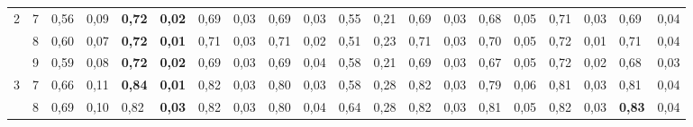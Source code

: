 \documentclass[conference]{IEEEtran}
\begin{document}
\begin{table}[]
\begin{tabular}{|cl|ll|ll|ll|ll|ll|ll|ll|ll|ll|}
		\multicolumn{1}{|c|}{\multirow{3}{*}{2}}  & 7 & \multicolumn{1}{l|}{0,56}          & 0,09          & \multicolumn{1}{l|}{\textbf{0,72}} & \textbf{0,02} & \multicolumn{1}{l|}{0,69}          & 0,03          & \multicolumn{1}{l|}{0,69} & 0,03          & \multicolumn{1}{l|}{0,55}                 & 0,21          & \multicolumn{1}{l|}{0,69}          & 0,03          & \multicolumn{1}{l|}{0,68}          & 0,05          & \multicolumn{1}{l|}{0,71}          & 0,03          & \multicolumn{1}{l|}{0,69}          & 0,04          \\ \cline{2-20} 
		\multicolumn{1}{|c|}{}                    & 8 & \multicolumn{1}{l|}{0,60}          & 0,07          & \multicolumn{1}{l|}{\textbf{0,72}} & \textbf{0,01} & \multicolumn{1}{l|}{0,71}          & 0,03          & \multicolumn{1}{l|}{0,71} & 0,02          & \multicolumn{1}{l|}{0,51}                 & 0,23          & \multicolumn{1}{l|}{0,71}          & 0,03          & \multicolumn{1}{l|}{0,70}          & 0,05          & \multicolumn{1}{l|}{0,72}          & 0,01          & \multicolumn{1}{l|}{0,71}          & 0,04          \\ \cline{2-20} 
		\multicolumn{1}{|c|}{}                    & 9 & \multicolumn{1}{l|}{0,59}          & 0,08          & \multicolumn{1}{l|}{\textbf{0,72}} & \textbf{0,02} & \multicolumn{1}{l|}{0,69}          & 0,03          & \multicolumn{1}{l|}{0,69} & 0,04          & \multicolumn{1}{l|}{0,58}                 & 0,21          & \multicolumn{1}{l|}{0,69}          & 0,03          & \multicolumn{1}{l|}{0,67}          & 0,05          & \multicolumn{1}{l|}{0,72}          & 0,02          & \multicolumn{1}{l|}{0,68}          & 0,03          \\ \hline
		\multicolumn{1}{|c|}{\multirow{3}{*}{3}}  & 7 & \multicolumn{1}{l|}{0,66}          & 0,11          & \multicolumn{1}{l|}{\textbf{0,84}} & \textbf{0,01} & \multicolumn{1}{l|}{0,82}          & 0,03          & \multicolumn{1}{l|}{0,80} & 0,03          & \multicolumn{1}{l|}{0,58}                 & 0,28          & \multicolumn{1}{l|}{0,82}          & 0,03          & \multicolumn{1}{l|}{0,79}          & 0,06          & \multicolumn{1}{l|}{0,81}          & 0,03          & \multicolumn{1}{l|}{0,81}          & 0,04          \\ \cline{2-20} 
		\multicolumn{1}{|c|}{}                    & 8 & \multicolumn{1}{l|}{0,69}          & 0,10          & \multicolumn{1}{l|}{0,82}          & \textbf{0,03} & \multicolumn{1}{l|}{0,82}          & 0,03          & \multicolumn{1}{l|}{0,80} & 0,04          & \multicolumn{1}{l|}{0,64}                 & 0,28          & \multicolumn{1}{l|}{0,82}          & 0,03          & \multicolumn{1}{l|}{0,81}          & 0,05          & \multicolumn{1}{l|}{0,82}          & 0,03          & \multicolumn{1}{l|}{\textbf{0,83}} & 0,04          \\ \cline{2-20} 

\end{tabular}
\end{table}
\end{document}

